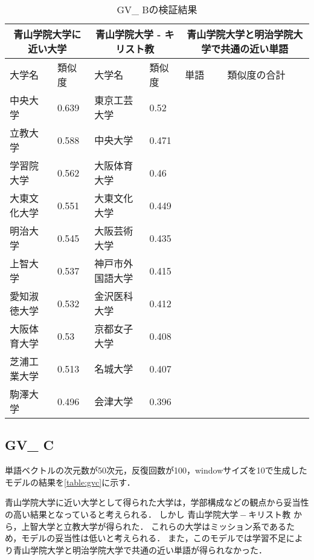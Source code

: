 \begin{table}[H]
\caption{GV\_ Bの検証結果}
\centering
\footnotesize
\begin{tabular}{ll|ll|ll}
\hline
\multicolumn{2}{c}{青山学院大学に近い大学} & \multicolumn{2}{c}{青山学院大学 - キリスト教} & \multicolumn{2}{c}{青山学院大学と明治学院大学で共通の近い単語}
\\ \hline
大学名 & 類似度 & 大学名 & 類似度 & 単語 & 類似度の合計
\\ \hline \hline
中央大学 & 0.639 & 東京工芸大学 & 0.52 & & \\
立教大学 & 0.588 & 中央大学 & 0.471 & & \\
学習院大学 & 0.562 & 大阪体育大学 & 0.46 & & \\
大東文化大学 & 0.551 & 大東文化大学 & 0.449 & & \\
明治大学 & 0.545 & 大阪芸術大学 & 0.435 & & \\
上智大学 & 0.537 & 神戸市外国語大学 & 0.415 & & \\
愛知淑徳大学 & 0.532 & 金沢医科大学 & 0.412 & & \\
大阪体育大学 & 0.53 & 京都女子大学 & 0.408 & & \\
芝浦工業大学 & 0.513 & 名城大学 & 0.407 & & \\
駒澤大学 & 0.496 & 会津大学 & 0.396 & & \\ \hline
\end{tabular}
\label{table:gvb}
\end{table}

\subsection{GV\_ C}
単語ベクトルの次元数が50次元，反復回数が100，windowサイズを10で生成したモデルの結果を\ref{table:gvc}に示す．

青山学院大学に近い大学として得られた大学は，学部構成などの観点から妥当性の高い結果となっていると考えられる．
しかし $ 青山学院大学 - キリスト教 $ から，上智大学と立教大学が得られた．
これらの大学はミッション系であるため，モデルの妥当性は低いと考えられる．
また，このモデルでは学習不足により青山学院大学と明治学院大学で共通の近い単語が得られなかった．

